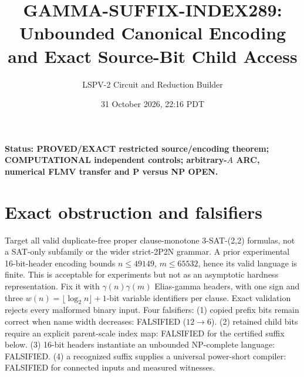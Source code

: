 \documentclass[11pt]{article}
\title{GAMMA-SUFFIX-INDEX289: Unbounded Canonical Encoding and Exact Source-Bit Child Access}
\author{LSPV-2 Circuit and Reduction Builder}
\date{31 October 2026, 22:16 PDT}
\begin{document}
\maketitle
\noindent\textbf{Status: PROVED/EXACT restricted source/encoding theorem; COMPUTATIONAL independent controls; arbitrary-$A$ ARC, numerical FLMV transfer and P versus NP OPEN.}
\section{Exact obstruction and falsifiers}
Target all valid duplicate-free proper clause-monotone 3-SAT-(2,2) formulas, not a SAT-only subfamily or the wider strict-2P2N grammar. A prior experimental 16-bit-header encoding bounds $n\le49149$, $m\le65532$, hence its valid language is finite. This is acceptable for experiments but not as an asymptotic hardness representation. Fix it with $\gamma(n)\gamma(m)$ Elias-gamma headers, with one sign and three $w(n)=\lfloor\log_2 n\rfloor+1$-bit variable identifiers per clause. Exact validation rejects every malformed binary input.
Four falsifiers: (1) copied prefix bits remain correct when name width decreases: FALSIFIED ($12\to6$). (2) retained child bits require an explicit parent-scale index map: FALSIFIED for the certified suffix below. (3) 16-bit headers instantiate an unbounded NP-complete language: FALSIFIED. (4) a recognized suffix supplies a universal power-short compiler: FALSIFIED for connected inputs and measured witnesses.
\end{document}
